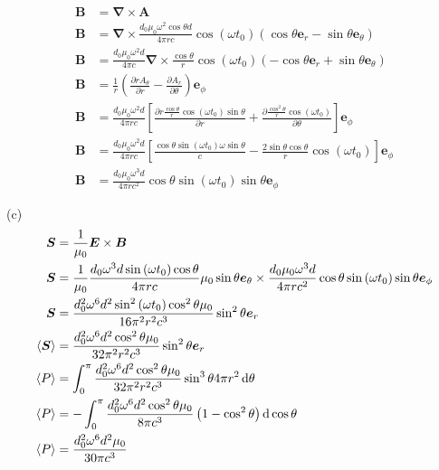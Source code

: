 \begin{align*}
    \boldsymbol{B}&=\boldsymbol{\nabla}\times\boldsymbol{A}\\
    \boldsymbol{B}&=\boldsymbol{\nabla}\times\frac{d_0\mu_0\omega^2\cos\theta d}{4\pi rc}
    \cos\left(\omega t_0\right)\left(\cos\theta{\boldsymbol{e}_r} -\sin\theta{\boldsymbol{e}_\theta} \right)\\
    \boldsymbol{B}&=\frac{d_0\mu_0\omega^2d}{4\pi c}\boldsymbol{\nabla}\times\frac{\cos\theta }{r}
    \cos\left(\omega t_0\right)\left(-\cos\theta{\boldsymbol{e}_r} +\sin\theta{\boldsymbol{e}_\theta} \right)\\
    \boldsymbol{B}&=\frac{1}{r}\left(\frac{\partial rA_\theta}{\partial r}
    -\frac{\partial A_r}{\partial \theta}\right)\boldsymbol{e}_\phi\\
    \boldsymbol{B}&=\frac{d_0\mu_0\omega^2d}{4\pi rc}\left[\frac{\partial r\frac{\cos\theta }{r}
    \cos\left(\omega t_0\right)\sin\theta}{\partial r}
    +\frac{\partial \frac{\cos^2\theta }{r}
    \cos\left(\omega t_0\right)}{\partial \theta}\right]\boldsymbol{e}_\phi\\
    \boldsymbol{B}&=\frac{d_0\mu_0\omega^2d}{4\pi rc}\left[\frac{\cos\theta
    \sin\left(\omega t_0\right)\omega\sin\theta}{c}
    -\frac{2\sin\theta\cos\theta }{r}
    \cos\left(\omega t_0\right)\right]\boldsymbol{e}_\phi\\
    \boldsymbol{B}&=\frac{d_0\mu_0\omega^3d}{4\pi rc^2}\cos\theta
    \sin\left(\omega t_0\right)\sin\theta
    \boldsymbol{e}_\phi
\end{align*}

(c)\begin{align*}
    \boldsymbol{S}&=\frac{1}{\mu_0}\boldsymbol{E}\times\boldsymbol{B}\\
    \boldsymbol{S}&=\frac{1}{\mu_0}\frac{d_0\omega^3d\sin\left(\omega t_0\right)\cos\theta}{4\pi rc}\mu_0\sin\theta{\boldsymbol{e}_\theta}\times\frac{d_0\mu_0\omega^3d}{4\pi rc^2}\cos\theta
    \sin\left(\omega t_0\right)\sin\theta
    \boldsymbol{e}_\phi\\
    \boldsymbol{S}&=\frac{d_0^2\omega^6d^2\sin^2\left(\omega t_0\right)\cos^2\theta\mu_0}{16\pi^2 r^2c^3}\sin^2\theta
    \boldsymbol{e}_r\\
    \langle \boldsymbol{S}\rangle&=\frac{d_0^2\omega^6d^2\cos^2\theta\mu_0}{32\pi^2 r^2c^3}\sin^2\theta
    \boldsymbol{e}_r\\
    \langle P\rangle&=\int_{0}^{\pi}\frac{d_0^2\omega^6d^2\cos^2\theta\mu_0}{32\pi^2 r^2c^3}\sin^3\theta 4\pi r^2\dif \theta\\
    \langle P\rangle&=-\int_{0}^{\pi}\frac{d_0^2\omega^6d^2\cos^2\theta\mu_0}{8\pi c^3}\left(1-\cos^2\theta\right)\dif \cos\theta\\
    \langle P\rangle&=\frac{d_0^2\omega^6d^2\mu_0}{30\pi c^3}
\end{align*}
